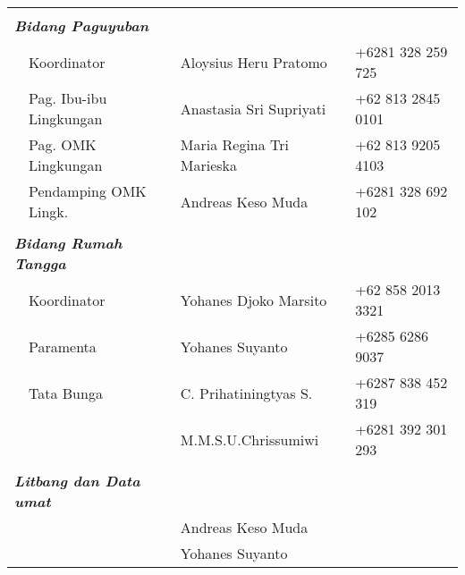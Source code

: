 \begin{longtable}{p{0.5cm}p{4cm}p{5cm}p{4cm}}
	\setcounter{nourut}{0}\\
	\multicolumn{2}{l}{\textit{\textbf{Bidang Paguyuban}}}&&\\
	&Koordinator&Aloysius Heru Pratomo&+6281 328 259 725\\
	\nexturut&Pag. Ibu-ibu Lingkungan&Anastasia Sri Supriyati&+62 813 2845 0101\\
	\nexturut&Pag. OMK Lingkungan&Maria Regina Tri Marieska&+62 813 9205 4103\\
	\nexturut&Pendamping OMK Lingk.&Andreas Keso Muda&+6281 328 692 102\\
	
	\setcounter{nourut}{0}\\
	\multicolumn{2}{l}{\textit{\textbf{Bidang Rumah Tangga}}}&&\\
	&Koordinator&Yohanes Djoko Marsito&+62 858 2013 3321\\
	\nexturut&Paramenta&Yohanes Suyanto&+6285 6286 9037\\
	\nexturut&Tata Bunga&C. Prihatiningtyas S.&+6287 838 452 319\\
	&&M.M.S.U.Chrissumiwi&+6281 392 301 293\\
	
	
	\setcounter{nourut}{0}\\
	\multicolumn{2}{l}{\textit{\textbf{Litbang dan Data umat}}}&&\\
	&&Andreas Keso Muda&\\
	&&Yohanes Suyanto&\\
\end{longtable}

